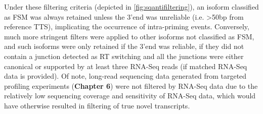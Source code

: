 \begin{figure}[h]
	\label{fig:lib_prep_artifacts}
\end{figure}

Under these filtering criteria (depicted in \cref{fig:sqantifiltering}), an isoform classified as FSM was always retained unless the 3'end was unreliable (i.e. >50bp from reference TTS), implicating the occurrence of intra-priming events. Conversely, much more stringent filters were applied to other isoforms not classified as FSM, and such isoforms were only retained if the 3'end was reliable, if they did not contain a junction detected as RT switching and all the junctions were either canonical or supported by at least three RNA-Seq reads (if matched RNA-Seq data is provided). Of note, long-read sequencing data generated from targeted profiling experiments (\textbf{Chapter 6}) were not filtered by RNA-Seq data due to the relatively low sequencing coverage and sensitivity of RNA-Seq data, which would have otherwise resulted in filtering of true novel transcripts. 

